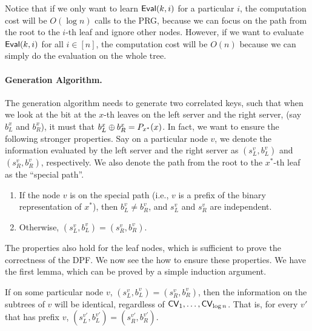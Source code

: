 Notice that if we only want to learn ${\sf Eval}(k, i)$ for a particular $i$, the computation cost will be $O(\log n)$ calls to the PRG, because we can focus on the path from the root to the $i$-th leaf and ignore other nodes.
However, if we want to evaluate ${\sf Eval}(k, i)$ for all $i\in[n]$, the computation cost will be $O(n)$ because we can simply do the evaluation on the whole tree. 




\paragraph{Generation Algorithm.} The generation algorithm needs to generate two correlated keys, such that when we look at the bit at the $x$-th leaves on the left server and the right server, (say $b^{x}_{L}$ and $b^{x}_{R}$), it must that $b^{x}_{L}\oplus b^{x}_{R}=P_{x^*}(x)$. In fact, we want to ensure the following stronger properties.
Say on a particular node $v$, we denote the information evaluated by the left server and the right server as $(s^v_L,b^v_L)$ and $(s^v_R,b^v_R)$, respectively.
We also denote the path from the root to the $x^*$-th leaf as the ``special path''.

\begin{enumerate}
    \item If the node $v$ is on the special path (i.e., $v$ is a prefix of the binary representation of $x^*$), then $b^v_L\ne b^v_R$, and $s^v_L$ and $s^v_R$ are independent.
    
    \item Otherwise, $(s^v_L,b^v_L)=(s^v_R,b^v_R)$.
\end{enumerate}

The properties also hold for the leaf nodes, which is sufficient to prove the correctness of the DPF. 
We now see the how to ensure these properties.
We have the first lemma, which can be proved by a simple induction argument.

\begin{lemma}
    If on some particular node $v$, $(s^v_L,b^v_L)=(s^v_R,b^v_R)$, then the information on the subtrees of $v$ will be identical, regardless of ${\sf CV}_1,\dots,{\sf CV}_{\log n}$. That is, for every $v'$ that has prefix $v$, $(s^{v'}_L,b^{v'}_L)=(s^{v'}_R,b^{v'}_R)$. 
\end{lemma}

